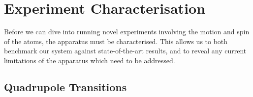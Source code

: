 \chapter{Experiment Characterisation}
\label{ch:Characterisation}
\minitoc

    Before we can dive into running novel experiments involving the motion and spin
    of the atoms, the apparatus must be characterised. This allows us to both
    benchmark our system against state-of-the-art results, and to reveal any
    current limitations of the apparatus which need to be addressed.

\section{Quadrupole Transitions}
\label{sec:Transitions}
